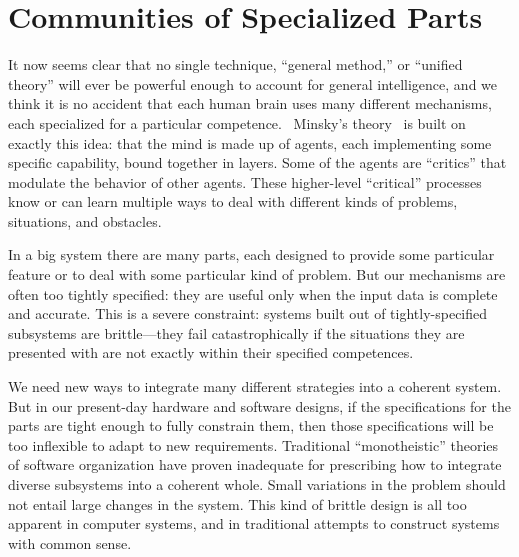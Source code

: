 \documentclass[letterpaper]{article}
\begin{document}
\section{Communities of Specialized Parts}

It now seems clear that no single technique, ``general method,'' or
``unified theory'' will ever be powerful enough to account for general
intelligence, and we think it is no accident that each human brain
uses many different mechanisms, each specialized for a particular
competence.~\cite{kanwisher98,chomsky05} Minsky's
theory~\cite{societyofmind,emotionmachine} is built on exactly this
idea: that the mind is made up of agents, each implementing some
specific capability, bound together in layers.  Some of the agents are
``critics'' that modulate the behavior of other agents.  These
higher-level ``critical'' processes know or can learn multiple ways to
deal with different kinds of problems, situations, and obstacles.


In a big system there are many parts, each designed to provide some
particular feature or to deal with some particular kind of problem.
But our mechanisms are often too tightly specified: they are useful
only when the input data is complete and accurate.  This is a severe
constraint: systems built out of tightly-specified subsystems are
brittle---they fail catastrophically if the situations they are
presented with are not exactly within their specified competences.

We need new ways to integrate many different strategies into a
coherent system.  But in our present-day hardware and software
designs, if the specifications for the parts are tight enough to fully
constrain them, then those specifications will be too inflexible to
adapt to new requirements.  Traditional ``monotheistic'' theories of
software organization have proven inadequate for prescribing how to
integrate diverse subsystems into a coherent whole.  Small variations
in the problem should not entail large changes in the system.  This
kind of brittle design is all too apparent in computer systems, and in
traditional attempts to construct systems with common sense.
\end{document}
